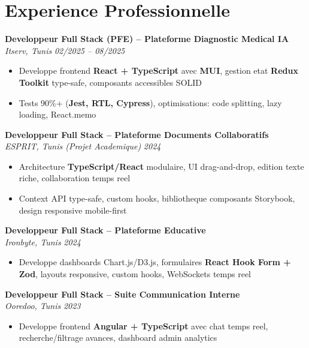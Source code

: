 \documentclass[10pt,a4paper]{article}
\begin{document}
\section*{Experience Professionnelle}
{\small

\textbf{Developpeur Full Stack (PFE) -- Plateforme Diagnostic Medical IA}\\[1pt]
\textit{Itserv, Tunis} \hfill \textit{02/2025 -- 08/2025}
\begin{itemize}[leftmargin=12pt,itemsep=2pt,topsep=3pt,parsep=0pt]
  \item Developpe frontend \textbf{React + TypeScript} avec \textbf{MUI}, gestion etat \textbf{Redux Toolkit} type-safe, composants accessibles SOLID
  \item Tests 90\%+ (\textbf{Jest, RTL, Cypress}), optimisations: code splitting, lazy loading, React.memo
\end{itemize}

\vspace{3pt}
\textbf{Developpeur Full Stack -- Plateforme Documents Collaboratifs}\\[1pt]
\textit{ESPRIT, Tunis (Projet Academique)} \hfill \textit{2024}
\begin{itemize}[leftmargin=12pt,itemsep=2pt,topsep=3pt,parsep=0pt]
  \item Architecture \textbf{TypeScript/React} modulaire, UI drag-and-drop, edition texte riche, collaboration temps reel
  \item Context API type-safe, custom hooks, bibliotheque composants Storybook, design responsive mobile-first
\end{itemize}

\vspace{3pt}
\textbf{Developpeur Full Stack -- Plateforme Educative}\\[1pt]
\textit{Ironbyte, Tunis} \hfill \textit{2024}
\begin{itemize}[leftmargin=12pt,itemsep=2pt,topsep=3pt,parsep=0pt]
  \item Developpe dashboards Chart.js/D3.js, formulaires \textbf{React Hook Form + Zod}, layouts responsive, custom hooks, WebSockets temps reel
\end{itemize}

\vspace{3pt}
\textbf{Developpeur Full Stack -- Suite Communication Interne}\\[1pt]
\textit{Ooredoo, Tunis} \hfill \textit{2023}
\begin{itemize}[leftmargin=12pt,itemsep=2pt,topsep=3pt,parsep=0pt]
  \item Developpe frontend \textbf{Angular + TypeScript} avec chat temps reel, recherche/filtrage avances, dashboard admin analytics
\end{itemize}

}
\end{document}
